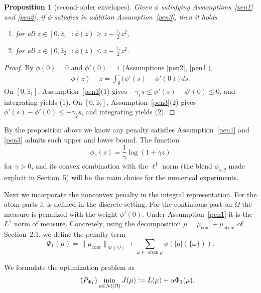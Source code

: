 \documentclass[11pt]{amsart}
\newtheorem{proposition}[theorem]{Proposition}
\theoremstyle{definition}
\theoremstyle{remark}
\DeclareMathOperator{\atom}{atom}
\DeclareMathOperator{\cont}{cont}
\begin{document}
\begin{proposition}[second-order envelopes]
\label{secondorderestimate}
	Given $\phi$ satisfying Assumptions~\ref{pen1} and \ref{pen2}, if $\phi$ satisfies in addition Assumption~\ref{pen3}, then it holds
	\begin{enumerate}
		\item for all $ z \in [0, \hat{z}_1]: \phi(z) \ge z - \frac{\gamma_1}{2} z^2$,
		\item for all $z \in [0, \hat{z}_2]: \phi(z) \le z - \frac{\gamma_2}{2}z^2$.
	\end{enumerate}
\end{proposition}
\begin{proof}
	By $\phi(0) = 0$ and $\phi'(0) = 1$ (Assumptions \ref{pen2}, \ref{pen1}),
	\begin{align*}
		\phi(z) - z = \int_0^{z} \big( \phi'(s) - \phi'(0) \big)\, ds .
	\end{align*}
	On $[0, \hat{z}_1]$, Assumption~\ref{pen3}(1) gives $-\gamma_1 s \le \phi'(s) - \phi'(0) \le 0$, and integrating yields (1). On $[0, \hat{z}_2]$, Assumption~\ref{pen3}(2) gives $\phi'(s) - \phi'(0) \le -\gamma_2 s$, and integrating yields (2).
\end{proof}

By the proposition above we know any penalty satisfies Assumption~\ref{pen1} and \ref{pen3} admits such upper and lower bound. 
The function
\begin{equation}
	\phi_{\gamma}(z) = \frac{1}{\gamma} \log ( 1 + \gamma z)
\end{equation}
for $\gamma > 0$, and its convex combination with the $\ell^1$ norm (the blend $\phi_{\gamma,\theta}$ made explicit in Section~5) will be the main choice for the numerical experiments. 

Next we incorporate the nonconvex penalty in the integral representation.
For the atom parts it is defined in the discrete setting. 
For the continuous part on $\Omega$ the measure is penalized with the weight $\phi'(0)$. 
Under Assumption~\ref{pen1} it is the $L^1$ norm of measure. 
Concretely, using the decomposition $\mu = \mu_{\cont} + \mu_{\atom}$ of Section~2.1, we define the penalty term
\begin{equation}
	\Phi_1(\mu) = \|\mu_{\cont}\|_{\mathcal{M}(\Omega)} + \sum_{\omega \in \atom \mu} \phi(|\mu|(\{\omega\})).
\end{equation}

We formulate the optimization problem as
\begin{equation*}
	\tag{$P_{\Phi_1}$}\label{int_noncon}
	\min_{\mu \in \mathcal{M}(\Omega)} J (\mu):= L(\mu) + \alpha \Phi_1(\mu).
\end{equation*}
\end{document}
